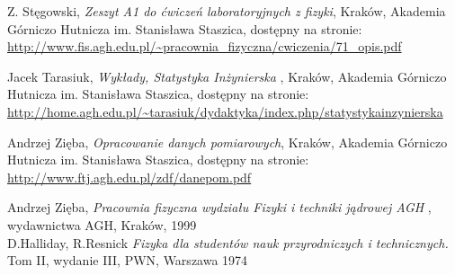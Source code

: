 \documentclass{article}
\begin{document}
\newpage

\begin{thebibliography}{9}
	
	Z. Stęgowski,
	\emph{Zeszyt A1 do ćwiczeń laboratoryjnych z fizyki}, Kraków, Akademia Górniczo Hutnicza im. Stanisława Staszica, dostępny na stronie:\\
	\url{http://www.fis.agh.edu.pl/\~pracownia\_fizyczna/cwiczenia/71\_opis.pdf}
	
	
	
	\bibitem[2]{}
	Jacek Tarasiuk,
	\emph{Wykłady, Statystyka Inżynierska} , Kraków, Akademia Górniczo Hutnicza im. Stanisława Staszica, dostępny na stronie:\\
	\url{http://home.agh.edu.pl/~tarasiuk/dydaktyka/index.php/statystykainzynierska}
	
	Andrzej Zięba,
	\emph{Opracowanie danych pomiarowych}, Kraków, Akademia Górniczo Hutnicza im. Stanisława Staszica, dostępny na stronie:\\
	\url{http://www.ftj.agh.edu.pl/zdf/danepom.pdf}
	\label{statystyka}
	
	Andrzej Zięba,
	\emph{Pracownia fizyczna wydziału Fizyki i techniki jądrowej AGH} , wydawnictwa AGH, Kraków, 1999\\
	
	
	D.Halliday, R.Resnick
	\emph{Fizyka dla studentów nauk przyrodniczych i technicznych.} Tom II, wydanie III, PWN, Warszawa 1974
	
\end{thebibliography}
\end{document}
